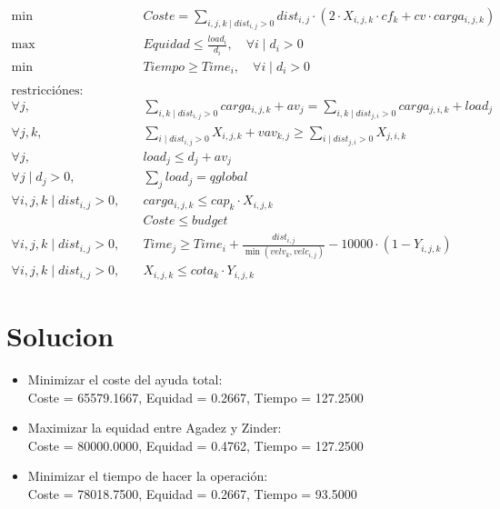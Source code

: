 \documentclass[]{article}
\begin{document}
\begin{align*}
	\min \; & Coste = \sum_{i,j,k \mid dist_{i,j} > 0} dist_{i,j}\cdot (2\cdot X_{i,j,k}\cdot cf_{k}+cv\cdot carga_{i,j,k})\\
	\max \; & Equidad \leq  \frac{load_i}{d_i}, \quad \forall i \mid d_i > 0\\
	\min \; & Tiempo \geq Time_i, \quad \forall i \mid d_i > 0\\ \\
	\text{restricciónes:}&\\
	\forall j, \quad &\sum_{i,k \mid dist_{i,j} > 0} carga_{i,j,k} + av_j = \sum_{i,k \mid dist_{j,i} > 0}  carga_{j,i,k} + load_j\\
	\forall j,k, \quad &\sum_{i \mid dist_{i,j} > 0} X_{i,j,k} + vav_{k,j} \geq \sum_{i \mid dist_{j,i} > 0} X_{j,i,k}\\
	\forall j, \quad &load_j \leq d_j + av_j\\
	\forall j \mid d_j > 0, \quad &\sum_j load_j = qglobal\\
	\forall i,j,k \mid dist_{i,j} > 0, \quad & carga_{i,j,k} \leq cap_k \cdot X_{i,j,k}\\
	& Coste \leq budget\\
	\forall i,j,k \mid dist_{i,j} > 0, \quad & Time_j \geq Time_i + \frac{dist_{i,j}}{\min(velv_k, velc_{i,j})} - 10000\cdot (1-Y_{i,j,k})\\
	\forall i,j,k \mid dist_{i,j} > 0, \quad & X_{i,j,k} \leq cota_k \cdot Y_{i,j,k}
\end{align*}

\section{Solucion}
\begin{itemize}
	\item Minimizar el coste del ayuda total:\\ Coste =  65579.1667, Equidad = 0.2667, Tiempo = 127.2500 
	\item Maximizar la equidad entre Agadez y Zinder: \\Coste = 80000.0000, Equidad =  0.4762, Tiempo = 127.2500 
	\item Minimizar el tiempo de hacer la operación: \\Coste = 78018.7500, Equidad =  0.2667, Tiempo = 93.5000
\end{itemize}
\end{document}
